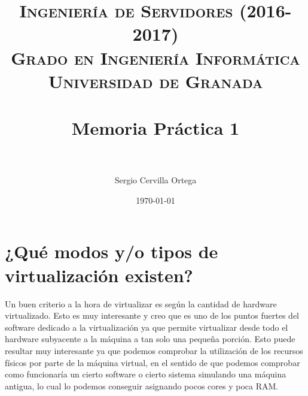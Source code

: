 

\usepackage[sfdefault]{roboto}
\usepackage{sectsty}
\usepackage{hyperref}


\sectionfont{\fontsize{12}{15}\selectfont}
\title{	
\normalfont \normalsize 
\textsc{\textbf{Ingeniería de Servidores (2016-2017)} \\ Grado en Ingeniería Informática \\ Universidad de Granada} \\ [25pt] %
\horrule{0.5pt} \\[0.4cm] %
\huge Memoria Práctica 1 \\ %
\horrule{2pt} \\[0.5cm] %
}

\author{Sergio Cervilla Ortega} %

\date{\normalsize\today} %




\maketitle %

\newpage %

\tableofcontents %

\listoffigures

\listoftables

\newpage

\section{¿Qué modos y/o tipos de virtualización existen?}

Un buen criterio a la hora de virtualizar es según la cantidad de hardware virtualizado. Esto es muy interesante y creo que es uno de los puntos fuertes del software dedicado a la virtualización ya que permite virtualizar desde todo el hardware subyacente a la máquina a tan solo una pequeña porción. Esto puede resultar muy interesante ya que podemos comprobar la utilización de los recursos físicos por parte de la máquina virtual, en el sentido de que podemos comprobar como funcionaría un cierto software o cierto sistema simulando una máquina antigua, lo cual lo podemos conseguir asignando pocos cores y poca RAM.\\

